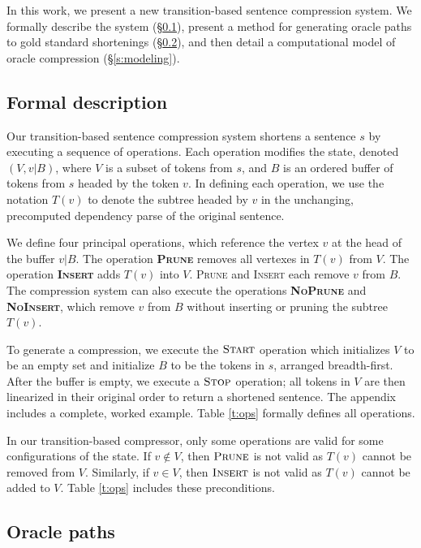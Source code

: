 \documentclass[11pt,a4paper]{article}
\begin{document}
In this work, we present a new transition-based sentence compression system. We formally describe the system (\S\ref{s:formal}), present a method for generating oracle paths to gold standard shortenings (\S\ref{s:oracle}), and then detail a computational model of oracle compression (\S\ref{s:modeling}).

\subsection{Formal description}\label{s:formal}

Our transition-based sentence compression system shortens a sentence $s$ by executing a sequence of operations. Each operation modifies the state, denoted $(V,v|B)$, where $V$ is a subset of tokens from $s$, and $B$ is an ordered buffer of tokens from $s$ headed by the token $v$. In defining each operation, we use the notation $T(v)$ to denote the subtree headed by $v$ in the unchanging, precomputed dependency parse of the original sentence.

We define four principal operations, which reference the vertex $v$ at the head of the buffer $v|B$. The operation \textbf{\textsc{Prune}} removes all vertexes in $T(v)$ from $V$. The operation \textbf{\textsc{Insert}} adds $T(v)$ into $V$. \textsc{Prune} and \textsc{Insert} each remove $v$ from $B$. The compression system can also execute the operations \textbf{\textsc{NoPrune}} and \textbf{\textsc{NoInsert}}, which remove $v$ from $B$ without inserting or pruning the subtree $T(v)$. 

To generate a compression, we execute the $\textsc{Start}$ operation which initializes $V$ to be an empty set and initialize $B$ to be the tokens in $s$, arranged breadth-first. After the buffer is empty, we execute a $\textsc{Stop}$ operation; all tokens in $V$ are then linearized in their original order to return a shortened sentence. The appendix includes a complete, worked example. Table \ref{t:ops} formally defines all operations. 

In our transition-based compressor, only some operations are valid for some configurations of the state. If $v \notin V$, then $\textsc{Prune}$ is not valid as $T(v)$ cannot be removed from $V$. Similarly, if $v \in V$, then $\textsc{Insert}$ is not valid as $T(v)$ cannot be added to $V$. Table \ref{t:ops} includes these preconditions.

\subsection{Oracle paths}\label{s:oracle}
\end{document}
